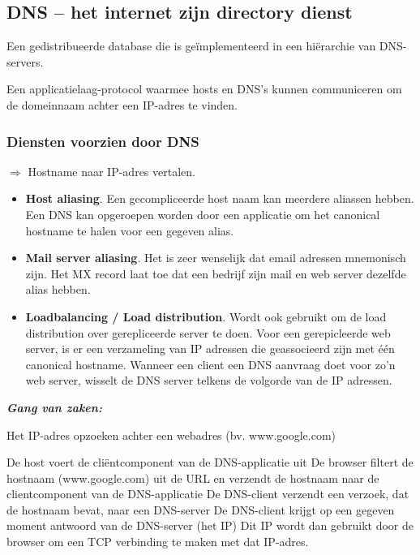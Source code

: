 \subsection{DNS – het internet zijn directory dienst}

Een gedistribueerde database die is geïmplementeerd in een hiërarchie van DNS-servers.

Een applicatielaag-protocol waarmee hosts en DNS’s kunnen communiceren om de domeinnaam achter een IP-adres te vinden.

\subsubsection{Diensten voorzien door DNS}

$\Rightarrow$ Hostname naar IP-adres vertalen.

\begin{itemize}
  \item \textbf{Host aliasing}. Een gecompliceerde host naam kan meerdere aliassen hebben. Een DNS kan opgeroepen worden door een applicatie om het canonical hostname te halen voor een gegeven alias.
\item \textbf{Mail server aliasing}. Het is zeer wenselijk dat email adressen mnemonisch zijn. Het MX record laat toe dat een bedrijf zijn mail en web server dezelfde alias hebben.
\item \textbf{Loadbalancing / Load distribution}. Wordt ook gebruikt om de load distribution over gerepliceerde server te doen. Voor een gerepicleerde web server, is er een verzameling van IP adressen die geassocieerd zijn met één canonical hostname. Wanneer een client een DNS aanvraag doet voor zo’n web server, wisselt de DNS server telkens de volgorde van de IP adressen.
\end{itemize}

\noindent \textit{\textbf{Gang van zaken:}}

\noindent Het IP-adres opzoeken achter een webadres (bv. www.google.com)

\be
\itf De host voert de cliëntcomponent van de DNS-applicatie uit
\itf De browser filtert de hostnaam (www.google.com) uit de URL en verzendt de hostnaam naar de clientcomponent van de DNS-applicatie
\itf De DNS-client verzendt een verzoek, dat de hostnaam bevat, naar een DNS-server
\itf De DNS-client krijgt op een gegeven moment antwoord van de DNS-server (het IP)
\itf Dit IP wordt dan gebruikt door de browser om een TCP verbinding te maken met dat IP-adres.
\ee

